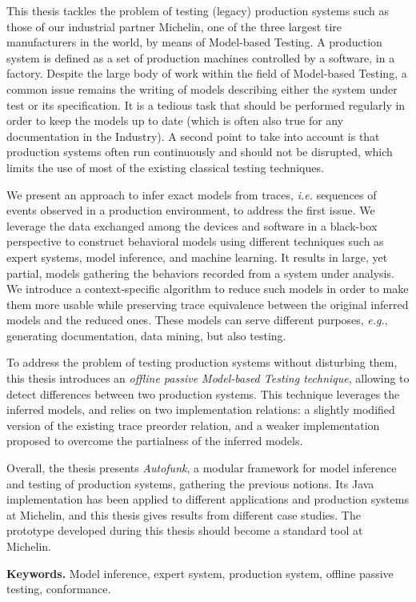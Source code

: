 This thesis tackles the problem of testing (legacy) production
systems such as those of our industrial partner Michelin, one of
the three largest tire manufacturers in the world, by means of
Model-based Testing. A production system is defined as a set of
production machines controlled by a software, in a factory.
Despite the large body of work within the field of Model-based
Testing, a common issue remains the writing of models describing
either the system under test or its specification. It is a
tedious task that should be performed regularly in order to keep
the models up to date (which is often also true for any
documentation in the Industry). A second point to take into
account is that production systems often run continuously and
should not be disrupted, which limits the use of most of the
existing classical testing techniques.

We present an approach to infer exact models from traces,
\emph{i.e.} sequences of events observed in a production
environment, to address the first issue. We leverage the data
exchanged among the devices and software in a black-box
perspective to construct behavioral models using different
techniques such as expert systems, model inference, and machine
learning. It results in large, yet partial, models gathering the
behaviors recorded from a system under analysis. We introduce a
context-specific algorithm to reduce such models in
order to make them more usable while preserving trace equivalence
between the original inferred models and the reduced ones. These
models can serve different purposes, \emph{e.g.}, generating
documentation, data mining, but also testing.

To address the problem of testing production systems without
disturbing them, this thesis introduces an \emph{offline passive
Model-based Testing technique}, allowing to detect differences
between two production systems. This technique leverages the
inferred models, and relies on two implementation relations: a
slightly modified version of the existing trace preorder
relation, and a weaker implementation proposed to overcome the
partialness of the inferred models.

Overall, the thesis presents \emph{Autofunk}, a modular framework
for model inference and testing of production systems, gathering
the previous notions. Its Java implementation has been applied to
different applications and production systems at Michelin, and
this thesis gives results from different case studies. The
prototype developed during this thesis should become a standard
tool at Michelin.

\textbf{Keywords.} Model inference, expert system, production
system, offline passive testing, conformance.
